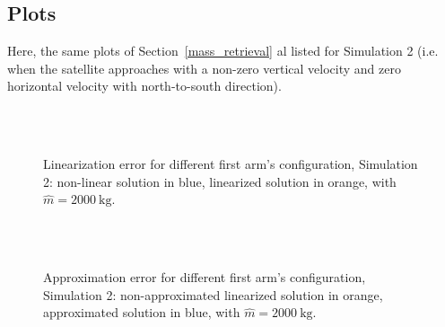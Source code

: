 \documentclass[a4paper,12pt,oneside]{report}
\begin{document}
\begin{appendices}
\chapter{Plots}\label{appendix_plots}
Here, the same plots of Section~\ref{mass_retrieval} al listed for Simulation 2 (i.e. when the satellite approaches with a non-zero vertical velocity and zero horizontal velocity with north-to-south direction).
\begin{figure}[h]
  \centering
  \subfloat[\emph{$q_{2,0}=\SI{0}{\radian}$}]{} \quad
  \subfloat[\emph{$q_{2,0}=\SI[parse-numbers = false]{\pi/6}{\radian}$}]{}\\
  \subfloat[\emph{$q_{2,0}=\SI[parse-numbers = false]{\pi/4}{\radian}$}]{}\quad
  \subfloat[\emph{$q_{2,0}=\SI[parse-numbers = false]{\pi/3}{\radian}$}]{}\\
  \subfloat[\emph{$q_{2,0}=\SI[parse-numbers = false]{\pi/2}{\radian}$}]{}
  \caption{Linearization error for different first arm's configuration, Simulation 2: non-linear solution in blue, linearized solution in orange, with $\hat{m}=\SI{2000}{\kilogram}$.}
  \label{linear_error_2}
\end{figure}
\begin{figure}[!h]
  \centering
  \subfloat[\emph{$q_{2,0}=\SI{0}{\radian}$}]{} \quad
  \subfloat[\emph{$q_{2,0}=\SI[parse-numbers = false]{\pi/6}{\radian}$}]{}\\
  \subfloat[\emph{$q_{2,0}=\SI[parse-numbers = false]{\pi/4}{\radian}$}]{}\quad
  \subfloat[\emph{$q_{2,0}=\SI[parse-numbers = false]{\pi/3}{\radian}$}]{}\\
  \subfloat[\emph{$q_{2,0}=\SI[parse-numbers = false]{\pi/2}{\radian}$}]{}
  \caption{Approximation error for different first arm's configuration, Simulation 2: non-approximated linearized solution in orange, approximated solution in blue, with $\hat{m}=\SI{2000}{\kilogram}$.}
  \label{approximation_error_2}
\end{figure}
\begin{figure}[h!]
  \centering
  
  \caption{}
  \label{q262}
\end{figure}
\begin{figure}[h!]
  \centering
  
  \caption{}
  \label{q242}
\end{figure}
\begin{figure}[h!]
  \centering
  
  \caption{}
  \label{q232}
\end{figure}
\begin{figure}[h!]
  \centering
  
  \caption{}
  \label{q222}
\end{figure}
\end{appendices}
\pagestyle{plain} %
\fancyhf{} %
\renewcommand{\headrulewidth}{0pt} %
\nocite{*}
{}

\end{document}
